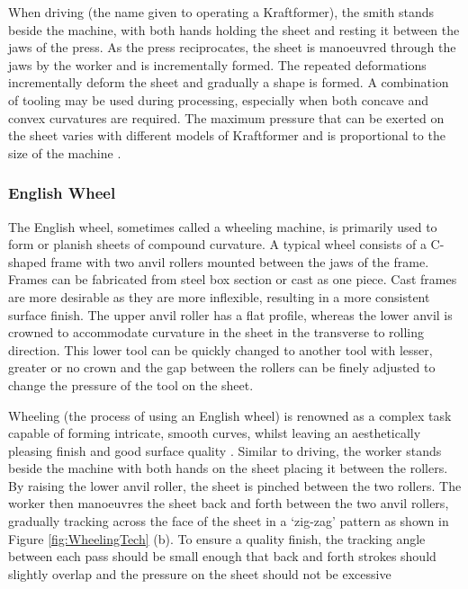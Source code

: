 When driving (the name given to operating a Kraftformer), the smith stands beside the machine, with both hands holding the sheet and resting it between the jaws of the press. As the press reciprocates, the sheet is manoeuvred through the jaws by the worker and is incrementally formed. The repeated deformations incrementally deform the sheet and gradually a shape is formed. A combination of tooling may be used during processing, especially when both concave and convex curvatures are required. The maximum pressure that can be exerted on the sheet varies with different models of Kraftformer and is proportional to the size of the machine \citep{Unknown2020ECKOLDBrochure}.

\subsubsection{English Wheel} \label{sec:ManualEW}

The English wheel, sometimes called a wheeling machine, is primarily used to form or planish sheets of compound curvature. A typical wheel consists of a C-shaped frame with two anvil rollers mounted between the jaws of the frame. Frames can be fabricated from steel box section or cast as one piece. Cast frames are more desirable as they are more inflexible, resulting in a more consistent surface finish. The upper anvil roller has a flat profile, whereas the lower anvil is crowned to accommodate curvature in the sheet in the transverse to rolling direction. This lower tool can be quickly changed to another tool with lesser, greater or no crown and the gap between the rollers can be finely adjusted to change the pressure of the tool on the sheet. 

Wheeling (the process of using an English wheel) is renowned as a complex task capable of forming intricate, smooth curves, whilst leaving an aesthetically pleasing finish and good surface quality \citep{Longyard2014LearningWheel}. Similar to driving, the worker stands beside the machine with both hands on the sheet placing it between the rollers. By raising the lower anvil roller, the sheet is pinched between the two rollers. The worker then manoeuvres the sheet back and forth between the two anvil rollers, gradually tracking across the face of the sheet in a `zig-zag' pattern as shown in Figure \ref{fig:WheelingTech} (b). To ensure a quality finish, the tracking angle between each pass should be small enough that back and forth strokes should slightly overlap and the pressure on the sheet should not be excessive 

